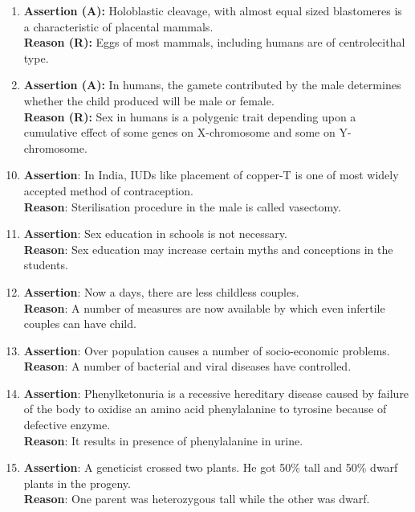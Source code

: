 \documentclass{article}
\begin{document}
\begin{enumerate}
    \item \textbf{Assertion (A):} Holoblastic cleavage, with almost equal sized blastomeres is a characteristic of placental mammals. \\
    \textbf{Reason (R):} Eggs of most mammals, including humans are of centrolecithal type.

    \item \textbf{Assertion (A):} In humans, the gamete contributed by the male determines whether the child produced will be male or female. \\
    \textbf{Reason (R):} Sex in humans is a polygenic trait depending upon a cumulative effect of some genes on X-chromosome and some on Y-chromosome.
\end{enumerate}

\begin{enumerate}
    \setcounter{enumi}{9}
    \item \textbf{Assertion}: In India, IUDs like placement of copper-T is one of most widely accepted method of contraception. \\
    \textbf{Reason}: Sterilisation procedure in the male is called vasectomy.
    
    \item \textbf{Assertion}: Sex education in schools is not necessary. \\
    \textbf{Reason}: Sex education may increase certain myths and conceptions in the students.
    
    \item \textbf{Assertion}: Now a days, there are less childless couples. \\
    \textbf{Reason}: A number of measures are now available by which even infertile couples can have child.
    
    \item \textbf{Assertion}: Over population causes a number of socio-economic problems. \\
    \textbf{Reason}: A number of bacterial and viral diseases have controlled.
    
    \item \textbf{Assertion}: Phenylketonuria is a recessive hereditary disease caused by failure of the body to oxidise an amino acid phenylalanine to tyrosine because of defective enzyme. \\
    \textbf{Reason}: It results in presence of phenylalanine in urine.
    
    \item \textbf{Assertion}: A geneticist crossed two plants. He got 50\% tall and 50\% dwarf plants in the progeny. \\
    \textbf{Reason}: One parent was heterozygous tall while the other was dwarf.
    

\end{enumerate}
\end{document}
